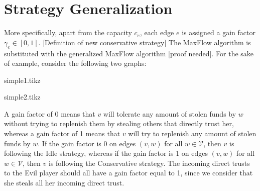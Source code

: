 \section{Strategy Generalization}
  More specifically, apart from the capacity $c_e$, each edge $e$ is assigned a gain factor $\gamma_e \in \left[0, 1\right]$.
  [Definition of new conservative strategy]
  The MaxFlow algorithm is substituted with the generalized MaxFlow algorithm [proof needed].
  For the sake of example, consider the following two graphs:
  
  {simple1.tikz}

  {simple2.tikz}

  A gain factor of 0 means that $v$ will tolerate any amount of stolen funds by $w$ without trying to replenish them by stealing
  others that directly trust her, whereas a gain factor of 1 means that $v$ will try to replenish any amount of stolen funds by
  $w$. If the gain factor is 0 on edges $\left(v, w\right)$ for all $w \in \mathcal{V}$, then $v$ is following the Idle
  strategy, whereas if the gain factor is 1 on edges $\left(v, w\right)$ for all $w \in \mathcal{V}$, then $v$ is following the
  Conservative strategy. The incoming direct trusts to the Evil player should all have a gain factor equal to 1, since we
  consider that she steals all her incoming direct trust.
